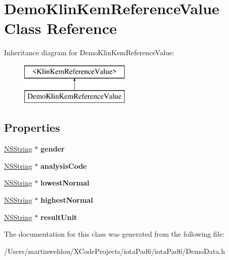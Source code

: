 \hypertarget{interface_demo_klin_kem_reference_value}{
\section{DemoKlinKemReferenceValue Class Reference}
\label{interface_demo_klin_kem_reference_value}
}
Inheritance diagram for DemoKlinKemReferenceValue:\begin{figure}[H]
\begin{center}
\leavevmode
\includegraphics[height=2.000000cm]{interface_demo_klin_kem_reference_value}
\end{center}
\end{figure}
\subsection*{Properties}
\begin{DoxyCompactItemize}
\item 
\hypertarget{interface_demo_klin_kem_reference_value_a926eec90f997daaa337a881eae1d3174}{
\hyperlink{class_n_s_string}{NSString} $\ast$ {\bfseries gender}}
\label{interface_demo_klin_kem_reference_value_a926eec90f997daaa337a881eae1d3174}

\item 
\hypertarget{interface_demo_klin_kem_reference_value_a37552a94bf580c15f0c9862d4bfd4992}{
\hyperlink{class_n_s_string}{NSString} $\ast$ {\bfseries analysisCode}}
\label{interface_demo_klin_kem_reference_value_a37552a94bf580c15f0c9862d4bfd4992}

\item 
\hypertarget{interface_demo_klin_kem_reference_value_a6387d3dfc1e998f3266d447da780a46e}{
\hyperlink{class_n_s_string}{NSString} $\ast$ {\bfseries lowestNormal}}
\label{interface_demo_klin_kem_reference_value_a6387d3dfc1e998f3266d447da780a46e}

\item 
\hypertarget{interface_demo_klin_kem_reference_value_a58c0e4c99f3bb66ad0e90c817cdb2a45}{
\hyperlink{class_n_s_string}{NSString} $\ast$ {\bfseries highestNormal}}
\label{interface_demo_klin_kem_reference_value_a58c0e4c99f3bb66ad0e90c817cdb2a45}

\item 
\hypertarget{interface_demo_klin_kem_reference_value_ac0c811ba32b1669b14f6360629381eef}{
\hyperlink{class_n_s_string}{NSString} $\ast$ {\bfseries resultUnit}}
\label{interface_demo_klin_kem_reference_value_ac0c811ba32b1669b14f6360629381eef}

\end{DoxyCompactItemize}


The documentation for this class was generated from the following file:\begin{DoxyCompactItemize}
\item 
/Users/martinwehlou/XCodeProjects/iotaPad6/iotaPad6/DemoData.h\end{DoxyCompactItemize}
